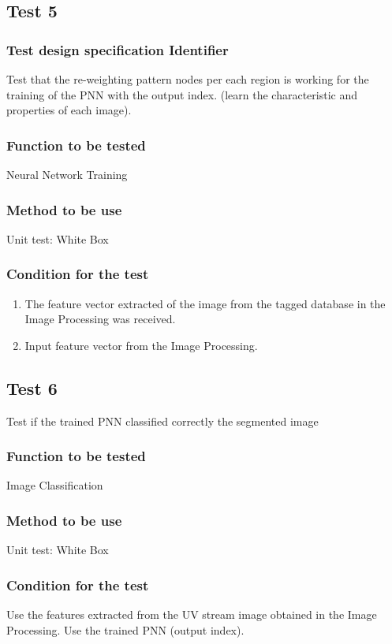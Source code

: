 \documentclass[12pt]{article}
\begin{document}
\subsection{Test 5}

\subsubsection{Test design specification Identifier}
Test that the re-weighting pattern nodes per each region is working for the training of the PNN with the output index. (learn the characteristic and properties of each image).
\subsubsection{Function to be tested}
Neural Network Training
\subsubsection{Method to be use}
Unit test: White Box
\subsubsection{Condition for the test}
\begin{enumerate}
  \item The feature vector extracted of the image from the tagged database in the Image Processing was received.
  \item Input feature vector from the Image Processing.
\end{enumerate}
\subsection{Test 6}

Test if the trained PNN classified correctly the segmented image
\subsubsection{Function to be tested}
Image Classification
\subsubsection{Method to be use}
Unit test: White Box
\subsubsection{Condition for the test}
Use the features extracted from the UV stream image obtained in the Image Processing.
Use the trained PNN (output index).
\end{document}
